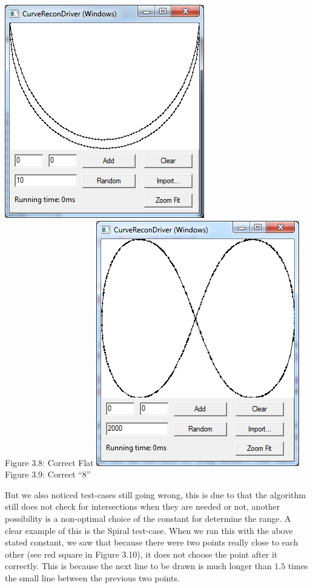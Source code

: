         \begin{center}
        \includegraphics[scale = 0.6]{2DirectedNearestNeighbor/dnnFlatgraph.png}\\
        \label{fig:ddn correctflat}
        Figure 3.8: Correct Flat
        \includegraphics[scale = 0.6]{2DirectedNearestNeighbor/dnnEightGraph.png}\\
        \label{fig:ddn correctflat}
        Figure 3.9: Correct ``8''
        \end{center}
        But we also noticed test-cases still going wrong, this is due to that the algorithm still does not check for intersections when they are needed or not, another possibility is a non-optimal choice of the constant for determine the range. A clear example of this is the Spiral test-case. When we ran this with the above stated constant, we saw that because there were two points really close to each other (see red square in Figure 3.10), it does not choose the point after it correctly. This is because the next line to be drawn is much longer than $1.5$ times the small line between the previous two points.\\
